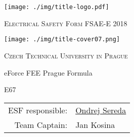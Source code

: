 	\centering	
\texttt{[image: ./img/title-logo.pdf]}
\vspace{.5cm}
{\scshape\huge Electrical Safety Form FSAE-E 2018 \par}
\vspace{.5cm}
\texttt{[image: ./img/title-cover07.png]}	
\vspace{.5cm}
{\scshape\Large Czech Technical University in Prague\par}
\vspace{.5cm}
{\LARGE eForce FEE Prague Formula\par}
\vspace{.9cm}
{\LARGE E67\par}
\vspace{.6cm}

\begin{table}[H]
	\centering
	\begin{tabular}{rl}
		ESF responsible: &  \href{mailto:ondrej.sereda@eforce.cvut.cz}{Ondrej Sereda}  \\
		Team Captain: & Jan Kosina   \\
	\end{tabular}%
	\label{tab:title}%
\end{table}%



\vfill